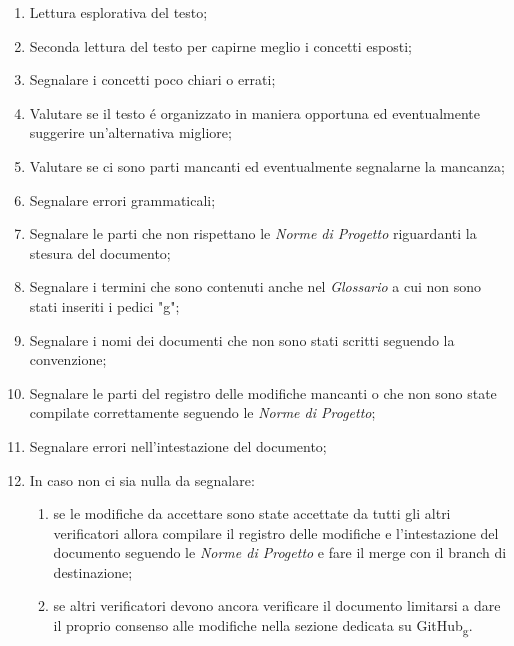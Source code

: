 \begin{enumerate}
    \item Lettura esplorativa del testo;
    \item Seconda lettura del testo per capirne meglio i concetti esposti;
    \item Segnalare i concetti poco chiari o errati;
    \item Valutare se il testo é organizzato in maniera opportuna ed eventualmente suggerire un'alternativa migliore;
    \item Valutare se ci sono parti mancanti ed eventualmente segnalarne la mancanza;
    \item Segnalare errori grammaticali;
    \item Segnalare le parti che non rispettano le \textit{Norme di Progetto} riguardanti la stesura del documento;
    \item Segnalare i termini che sono contenuti anche nel \textit{Glossario} a cui non sono stati inseriti i pedici "g";
    \item Segnalare i nomi dei documenti che non sono stati scritti seguendo la convenzione;
    \item Segnalare le parti del registro delle modifiche mancanti o che non sono state compilate correttamente seguendo le \textit{Norme di Progetto};
    \item Segnalare errori nell'intestazione del documento;
    \item In caso non ci sia nulla da segnalare:
        \begin{enumerate}
            \item se le modifiche da accettare sono state accettate da tutti gli altri verificatori allora compilare il registro delle modifiche 
                e l'intestazione del documento seguendo le \textit{Norme di Progetto} e fare il merge con il branch di destinazione;
            \item se altri verificatori devono ancora verificare il documento limitarsi a dare il proprio consenso alle modifiche nella sezione dedicata su GitHub\textsubscript{g}.
        \end{enumerate}  
\end{enumerate}